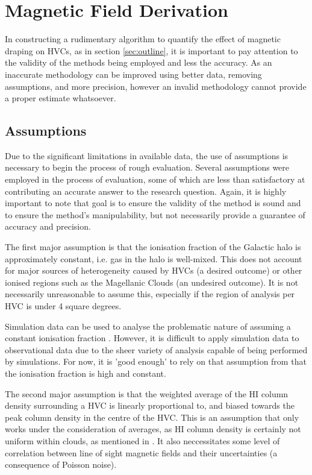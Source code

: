\chapter{Magnetic Field Derivation}
\label{cha:derivation}

In constructing a rudimentary algorithm to quantify the effect of magnetic draping on HVCs, as in section \ref{sec:outline}, it is important to pay attention to the validity of the methods being employed and less the accuracy. As an inaccurate methodology can be improved using better data, removing assumptions, and more precision, however an invalid methodology cannot provide a proper estimate whatsoever.

\section{Assumptions}
\label{sec:assumptions}

Due to the significant limitations in available data, the use of assumptions is necessary to begin the process of rough evaluation. Several assumptions were employed in the process of evaluation, some of which are less than satisfactory at contributing an accurate answer to the research question. Again, it is highly important to note that goal is to ensure the validity of the method is sound and to ensure the method's manipulability, but not necessarily provide a guarantee of accuracy and precision.


The first major assumption is that the ionisation fraction of the Galactic halo is approximately constant, i.e. gas in the halo is well-mixed. This does not account for major sources of heterogeneity caused by HVCs (a desired outcome) or other ionised regions such as the Magellanic Clouds (an undesired outcome). It is not necessarily unreasonable to assume this, especially if the region of analysis per HVC is under 4 square degrees.


Simulation data can be used to analyse the problematic nature of assuming a constant ionisation fraction \citep{ID23}. However, it is difficult to apply simulation data to observational data due to the sheer variety of analysis capable of being performed by simulations. For now, it is 'good enough' to rely on that assumption from \cite{ID23} that the ionisation fraction is high and constant.


The second major assumption is that the weighted average of the HI column density surrounding a HVC is linearly proportional to, and biased towards the peak column density in the centre of the HVC. This is an assumption that only works under the consideration of averages, as HI column density is certainly not uniform within clouds, as mentioned in \cite{ID69}. It also neccessitates some level of correlation between line of sight magnetic fields and their uncertainties (a consequence of Poisson noise).


